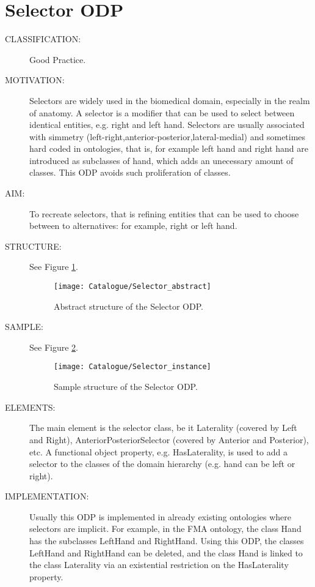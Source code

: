  \section{Selector ODP}\begin{description}
\item [CLASSIFICATION:] Good Practice.

\item [MOTIVATION:] Selectors are widely used in the biomedical domain, especially in the realm of anatomy. A selector is a modifier that can be used to select between identical entities, e.g. right and left hand. Selectors are usually associated with simmetry (left-right,anterior-posterior,lateral-medial) and sometimes hard coded in ontologies, that is, for example left hand and right hand are introduced as subclasses of hand, which adds an unecessary amount of classes. This ODP avoids such proliferation of classes.

\item [AIM:] To recreate selectors, that is refining entities that can be used to choose between to alternatives: for example, right or left hand.

\item [STRUCTURE:] See Figure \ref{odp:Selector_abstract}.
\begin{figure}[]\centering\texttt{[image: Catalogue/Selector\_abstract]}\caption{\label{odp:Selector_abstract} Abstract structure of the Selector ODP.}\end{figure}

\item [SAMPLE:] See Figure \ref{odp:Selector_instance}.
\begin{figure}[]\centering\texttt{[image: Catalogue/Selector\_instance]}\caption{\label{odp:Selector_instance} Sample structure of the Selector ODP.}\end{figure}

\item [ELEMENTS:] The main element is the selector class, be it Laterality (covered by Left and Right), AnteriorPosteriorSelector (covered by Anterior and Posterior), etc. A functional object property, e.g. HasLaterality, is used to add a selector to the classes of the domain hierarchy (e.g. hand can be left or right).

\item [IMPLEMENTATION:] Usually this ODP is implemented in already existing ontologies where selectors are implicit. For example, in the FMA ontology, the class Hand has the subclasses LeftHand and RightHand. Using this ODP, the classes LeftHand and RightHand can be deleted, and the class Hand is linked to the class Laterality via an existential restriction on the HasLaterality property.


\end{description}
